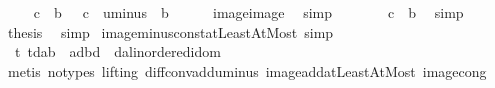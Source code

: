 \begin{isabellebody}
\ \ \isamarkupfalse%
\ {\isachardoublequoteopen}{\isacharparenleft}{\kern0pt}{\isacharminus}{\kern0pt}{\isacharparenright}{\kern0pt}\ c\ {\isacharbackquote}{\kern0pt}\ {\isacharbraceleft}{\kern0pt}{\isachardot}{\kern0pt}{\isachardot}{\kern0pt}b{\isacharbraceright}{\kern0pt}\ {\isacharequal}{\kern0pt}\ {\isacharparenleft}{\kern0pt}{\isacharplus}{\kern0pt}{\isacharparenright}{\kern0pt}\ c\ {\isacharbackquote}{\kern0pt}\ uminus\ {\isacharbackquote}{\kern0pt}\ {\isacharbraceleft}{\kern0pt}{\isachardot}{\kern0pt}{\isachardot}{\kern0pt}b{\isacharbraceright}{\kern0pt}{\isachardoublequoteclose}\isanewline
\ \ \ \ \isamarkupfalse%
\ image{\isacharunderscore}{\kern0pt}image\ \isamarkupfalse%
\ simp\isanewline
\ \ \isamarkupfalse%
\ \isamarkupfalse%
\ {\isachardoublequoteopen}{\isasymdots}\ {\isacharequal}{\kern0pt}\ {\isacharbraceleft}{\kern0pt}c\ {\isacharminus}{\kern0pt}\ b{\isachardot}{\kern0pt}{\isachardot}{\kern0pt}{\isacharbraceright}{\kern0pt}{\isachardoublequoteclose}\ \isamarkupfalse%
\ simp\isanewline
\ \ \isamarkupfalse%
\ \isamarkupfalse%
\ {\isacharquery}{\kern0pt}thesis\ \isamarkupfalse%
\ simp\isanewline
{}\isamarkupfalse%
%
\endisatagproof
{\isafoldproof}%
%
\isadelimproof
\isanewline
%
\endisadelimproof
\isanewline
{}\isamarkupfalse%
\ image{\isacharunderscore}{\kern0pt}minus{\isacharunderscore}{\kern0pt}const{\isacharunderscore}{\kern0pt}atLeastAtMost{\isacharprime}{\kern0pt}\ {\isacharbrackleft}{\kern0pt}simp{\isacharbrackright}{\kern0pt}{\isacharcolon}{\kern0pt}\isanewline
\ \ {\isachardoublequoteopen}{\isacharparenleft}{\kern0pt}{\isasymlambda}t{\isachardot}{\kern0pt}\ t{\isacharminus}{\kern0pt}d{\isacharparenright}{\kern0pt}{\isacharbackquote}{\kern0pt}{\isacharbraceleft}{\kern0pt}a{\isachardot}{\kern0pt}{\isachardot}{\kern0pt}b{\isacharbraceright}{\kern0pt}\ {\isacharequal}{\kern0pt}\ {\isacharbraceleft}{\kern0pt}a{\isacharminus}{\kern0pt}d{\isachardot}{\kern0pt}{\isachardot}{\kern0pt}b{\isacharminus}{\kern0pt}d{\isacharbraceright}{\kern0pt}{\isachardoublequoteclose}\ \ d{\isacharcolon}{\kern0pt}{\isacharcolon}{\kern0pt}{\isachardoublequoteopen}{\isacharprime}{\kern0pt}a{\isacharcolon}{\kern0pt}{\isacharcolon}{\kern0pt}linordered{\isacharunderscore}{\kern0pt}idom{\isachardoublequoteclose}\isanewline
%
\isadelimproof
\ \ %
\endisadelimproof
%
\isatagproof
{}\isamarkupfalse%
\ {\isacharparenleft}{\kern0pt}metis\ {\isacharparenleft}{\kern0pt}no{\isacharunderscore}{\kern0pt}types{\isacharcomma}{\kern0pt}\ lifting{\isacharparenright}{\kern0pt}\ diff{\isacharunderscore}{\kern0pt}conv{\isacharunderscore}{\kern0pt}add{\isacharunderscore}{\kern0pt}uminus\ image{\isacharunderscore}{\kern0pt}add{\isacharunderscore}{\kern0pt}atLeastAtMost{\isacharprime}{\kern0pt}\ image{\isacharunderscore}{\kern0pt}cong{\isacharparenright}{\kern0pt}%

\end{isabellebody}
